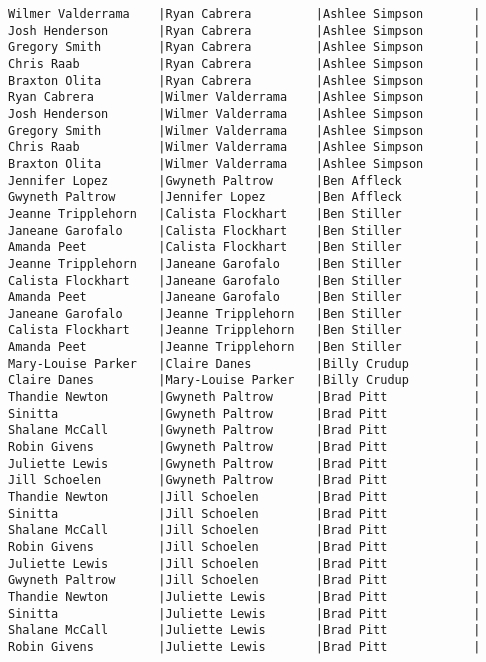 \documentclass{article}
\begin{document}
\begin{verbatim}
Wilmer Valderrama    |Ryan Cabrera         |Ashlee Simpson       |
Josh Henderson       |Ryan Cabrera         |Ashlee Simpson       |
Gregory Smith        |Ryan Cabrera         |Ashlee Simpson       |
Chris Raab           |Ryan Cabrera         |Ashlee Simpson       |
Braxton Olita        |Ryan Cabrera         |Ashlee Simpson       |
Ryan Cabrera         |Wilmer Valderrama    |Ashlee Simpson       |
Josh Henderson       |Wilmer Valderrama    |Ashlee Simpson       |
Gregory Smith        |Wilmer Valderrama    |Ashlee Simpson       |
Chris Raab           |Wilmer Valderrama    |Ashlee Simpson       |
Braxton Olita        |Wilmer Valderrama    |Ashlee Simpson       |
Jennifer Lopez       |Gwyneth Paltrow      |Ben Affleck          |
Gwyneth Paltrow      |Jennifer Lopez       |Ben Affleck          |
Jeanne Tripplehorn   |Calista Flockhart    |Ben Stiller          |
Janeane Garofalo     |Calista Flockhart    |Ben Stiller          |
Amanda Peet          |Calista Flockhart    |Ben Stiller          |
Jeanne Tripplehorn   |Janeane Garofalo     |Ben Stiller          |
Calista Flockhart    |Janeane Garofalo     |Ben Stiller          |
Amanda Peet          |Janeane Garofalo     |Ben Stiller          |
Janeane Garofalo     |Jeanne Tripplehorn   |Ben Stiller          |
Calista Flockhart    |Jeanne Tripplehorn   |Ben Stiller          |
Amanda Peet          |Jeanne Tripplehorn   |Ben Stiller          |
Mary-Louise Parker   |Claire Danes         |Billy Crudup         |
Claire Danes         |Mary-Louise Parker   |Billy Crudup         |
Thandie Newton       |Gwyneth Paltrow      |Brad Pitt            |
Sinitta              |Gwyneth Paltrow      |Brad Pitt            |
Shalane McCall       |Gwyneth Paltrow      |Brad Pitt            |
Robin Givens         |Gwyneth Paltrow      |Brad Pitt            |
Juliette Lewis       |Gwyneth Paltrow      |Brad Pitt            |
Jill Schoelen        |Gwyneth Paltrow      |Brad Pitt            |
Thandie Newton       |Jill Schoelen        |Brad Pitt            |
Sinitta              |Jill Schoelen        |Brad Pitt            |
Shalane McCall       |Jill Schoelen        |Brad Pitt            |
Robin Givens         |Jill Schoelen        |Brad Pitt            |
Juliette Lewis       |Jill Schoelen        |Brad Pitt            |
Gwyneth Paltrow      |Jill Schoelen        |Brad Pitt            |
Thandie Newton       |Juliette Lewis       |Brad Pitt            |
Sinitta              |Juliette Lewis       |Brad Pitt            |
Shalane McCall       |Juliette Lewis       |Brad Pitt            |
Robin Givens         |Juliette Lewis       |Brad Pitt            |

\end{verbatim}
\end{document}
